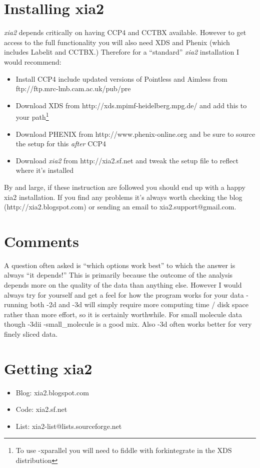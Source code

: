 \documentclass[a4paper, 11pt]{article}
\begin{document}
\section{Installing xia2}

\emph{xia2} depends critically on having CCP4 and CCTBX
available. However to get access to the full functionality you will
also need XDS and Phenix (which includes Labelit and CCTBX.) Therefore
for a ``standard'' \emph{xia2} installation I would recommend:

\begin{itemize}
\item{Install CCP4 include updated versions of Pointless and Aimless
    from ftp://ftp.mrc-lmb.cam.ac.uk/pub/pre}
\item{Download XDS from http://xds.mpimf-heidelberg.mpg.de/ and
    add this to your path\footnote{To use -xparallel you will need to
      fiddle with forkintegrate in the XDS distribution}}
\item{Download PHENIX from http://www.phenix-online.org and be sure to
    source the setup for this \emph{after} CCP4}
\item{Download \emph{xia2} from http://xia2.sf.net and tweak the setup
    file to reflect where it's installed}
\end{itemize}

\noindent
By and large, if these instruction are followed you should end up with
a happy xia2 installation. If you find any problems it's always worth
checking the blog (http://xia2.blogspot.com) or sending an email to
xia2.support@gmail.com.

\section{Comments}

A question often asked is ``which options work best'' to which the
answer is always ``it depends!'' This is primarily because the outcome of
the analysis depends more on the quality of the data than anything
else. However I would always try for yourself and get a feel for how
the program works for your data - running both -2d and -3d will simply
require more computing time / disk space rather than more effort, so
it is certainly worthwhile. For small molecule data though -3dii
-small\_molecule is a good mix. Also -3d often works better for very
finely sliced data.

\section{Getting xia2}
\begin{itemize}
\item{Blog: xia2.blogspot.com}
\item{Code: xia2.sf.net}
\item{List: xia2-list@lists.sourceforge.net}
\end{itemize}
\end{document}
